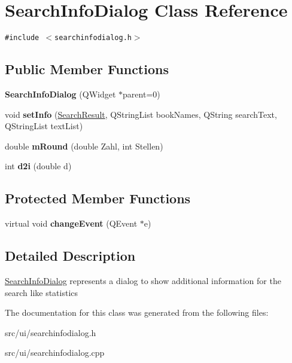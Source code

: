 \hypertarget{classSearchInfoDialog}{
\section{SearchInfoDialog Class Reference}
\label{classSearchInfoDialog}
}
{\tt \#include $<$searchinfodialog.h$>$}

\subsection*{Public Member Functions}
\begin{CompactItemize}
\item 
\hypertarget{classSearchInfoDialog_1baf3903eb275cf883a38cc533011132}{
\textbf{SearchInfoDialog} (QWidget $\ast$parent=0)}
\label{classSearchInfoDialog_1baf3903eb275cf883a38cc533011132}

\item 
\hypertarget{classSearchInfoDialog_6d0179b3897eadc1e9448115f81eec2e}{
void \textbf{setInfo} (\hyperlink{classSearchResult}{SearchResult}, QStringList bookNames, QString searchText, QStringList textList)}
\label{classSearchInfoDialog_6d0179b3897eadc1e9448115f81eec2e}

\item 
\hypertarget{classSearchInfoDialog_14b9e98ca49d1a408ec94772aeef6f5e}{
double \textbf{mRound} (double Zahl, int Stellen)}
\label{classSearchInfoDialog_14b9e98ca49d1a408ec94772aeef6f5e}

\item 
\hypertarget{classSearchInfoDialog_8b550144a861f190deae6c8b11c891e8}{
int \textbf{d2i} (double d)}
\label{classSearchInfoDialog_8b550144a861f190deae6c8b11c891e8}

\end{CompactItemize}
\subsection*{Protected Member Functions}
\begin{CompactItemize}
\item 
\hypertarget{classSearchInfoDialog_011443f10f6863a165787edfc1db61f7}{
virtual void \textbf{changeEvent} (QEvent $\ast$e)}
\label{classSearchInfoDialog_011443f10f6863a165787edfc1db61f7}

\end{CompactItemize}


\subsection{Detailed Description}
\hyperlink{classSearchInfoDialog}{SearchInfoDialog} represents a dialog to show additional information for the search like statistics 

The documentation for this class was generated from the following files:\begin{CompactItemize}
\item 
src/ui/searchinfodialog.h\item 
src/ui/searchinfodialog.cpp\end{CompactItemize}
